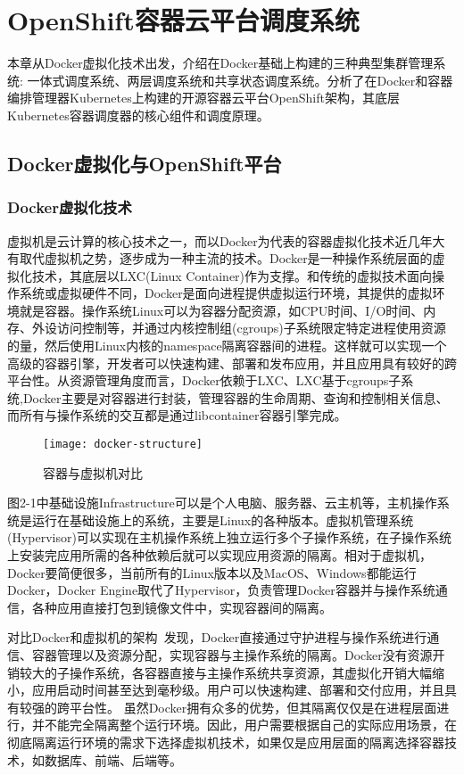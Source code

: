 \chapter{OpenShift容器云平台调度系统}
本章从Docker虚拟化技术出发，介绍在Docker基础上构建的三种典型集群管理系统: 一体式调度系统、两层调度系统和共享状态调度系统。分析了在Docker和容器编排管理器Kubernetes上构建的开源容器云平台OpenShift架构，其底层Kubernetes容器调度器的核心组件和调度原理。

\section{Docker虚拟化与OpenShift平台}
\label{sec:first}
\subsection{Docker虚拟化技术}
虚拟机是云计算的核心技术之一，而以Docker为代表的容器虚拟化技术近几年大有取代虚拟机之势，逐步成为一种主流的技术。Docker是一种操作系统层面的虚拟化技术，其底层以LXC(Linux Container)作为支撑。和传统的虚拟技术面向操作系统或虚拟硬件不同，Docker是面向进程提供虚拟运行环境，其提供的虚拟环境就是容器。操作系统Linux可以为容器分配资源，如CPU时间、I/O时间、内存、外设访问控制等，并通过内核控制组(cgroups)子系统限定特定进程使用资源的量，然后使用Linux内核的namespace隔离容器间的进程。这样就可以实现一个高级的容器引擎，开发者可以快速构建、部署和发布应用，并且应用具有较好的跨平台性。从资源管理角度而言，Docker依赖于LXC、LXC基于cgroups子系统,Docker主要是对容器进行封装，管理容器的生命周期、查询和控制相关信息、而所有与操作系统的交互都是通过libcontainer容器引擎完成。
\begin{figure}[H] %
	\centering
	\texttt{[image: docker-structure]}
	\caption{容器与虚拟机对比}
\end{figure}
图2-1中基础设施Infrastructure可以是个人电脑、服务器、云主机等，主机操作系统是运行在基础设施上的系统，主要是Linux的各种版本。虚拟机管理系统(Hypervisor)可以实现在主机操作系统上独立运行多个子操作系统，在子操作系统上安装完应用所需的各种依赖后就可以实现应用资源的隔离。相对于虚拟机，Docker要简便很多，当前所有的Linux版本以及MacOS、Windows都能运行Docker，Docker Engine取代了Hypervisor，负责管理Docker容器并与操作系统通信，各种应用直接打包到镜像文件中，实现容器间的隔离。

对比Docker和虚拟机的架构~\cite{Barik2017Performance, Felter2007An}发现，Docker直接通过守护进程与操作系统进行通信、容器管理以及资源分配，实现容器与主操作系统的隔离。Docker没有资源开销较大的子操作系统，各容器直接与主操作系统共享资源，其虚拟化开销大幅缩小，应用启动时间甚至达到毫秒级。用户可以快速构建、部署和交付应用，并且具有较强的跨平台性。
虽然Docker拥有众多的优势，但其隔离仅仅是在进程层面进行，并不能完全隔离整个运行环境。因此，用户需要根据自己的实际应用场景，在彻底隔离运行环境的需求下选择虚拟机技术，如果仅是应用层面的隔离选择容器技术，如数据库、前端、后端等。
